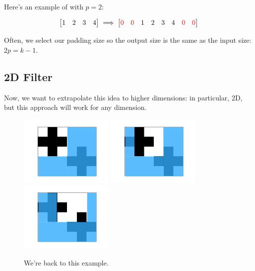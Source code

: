         \miniex Here's an example of  with $p=2$:

        \begin{equation}
            \begin{bmatrix}
                1 & 2 & 3 & 4
            \end{bmatrix}
            \implies 
            \begin{bmatrix}
                \textcolor{red}{0} & \textcolor{red}{0} & 1 & 2 & 3 & 4 & \textcolor{red}{0} & \textcolor{red}{0}
            \end{bmatrix}
        \end{equation}

        Often, we select our padding size so the output size is the same as the input size: $2p=k-1$.

    \pagebreak

    \subsection{2D Filter}

        Now, we want to extrapolate this idea to higher dimensions: in particular, 2D, but this approach will work for any dimension.


        \begin{figure}[H]
            \includegraphics[width=45mm,scale=0.5]{images/convolutional_neural_networks_images/window.png}
            \includegraphics[width=45mm,scale=0.5]{images/convolutional_neural_networks_images/window2.png}
            \includegraphics[width=45mm,scale=0.5]{images/convolutional_neural_networks_images/window3.png}
            
            \caption*{We're back to this example.}
        \end{figure}
        
